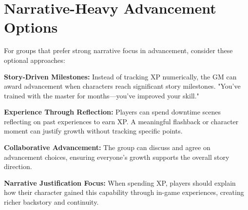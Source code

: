 \section{Narrative-Heavy Advancement Options}

For groups that prefer strong narrative focus in advancement, consider these optional approaches:

\textbf{Story-Driven Milestones:} Instead of tracking XP numerically, the GM can award advancement when characters reach significant story milestones. "You've trained with the master for months—you've improved your skill."

\textbf{Experience Through Reflection:} Players can spend downtime scenes reflecting on past experiences to earn XP. A meaningful flashback or character moment can justify growth without tracking specific points.

\textbf{Collaborative Advancement:} The group can discuss and agree on advancement choices, ensuring everyone's growth supports the overall story direction.

\textbf{Narrative Justification Focus:} When spending XP, players should explain how their character gained this capability through in-game experiences, creating richer backstory and continuity.